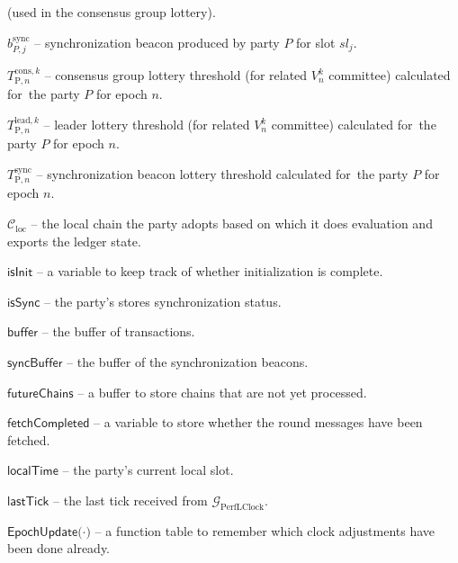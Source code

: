 \begin{legal}
    (used in the consensus group lottery).
    \item[\ding{113}] $b^{\text{sync}}_{P, j}$ -- synchronization beacon produced by party $P$ for slot $sl_j$.
    \item[\ding{113}] $T^{\text{cons}, k}_{\text{P}, n}$ -- consensus group lottery threshold (for related  $V^k_n$ committee) calculated for\
    the party $P$ for epoch $n$.
    \item[\ding{113}] $T^{\text{lead}, k}_{\text{P}, n}$ -- leader lottery threshold (for related $V^k_n$ committee) calculated for\
    the party $P$ for epoch $n$.
    \item[\ding{113}] $T^{\text{sync}}_{\text{P}, n}$ -- synchronization beacon lottery threshold calculated for\
    the party $P$ for epoch $n$.
    \item[\ding{113}] $\mathcal{C}_{\text{loc}}$ -- the local chain the party adopts based on which it does evaluation and
    exports the ledger state.
    \item[\ding{113}] $\textsf{isInit}$ -- a variable to keep track of whether initialization is complete.
    \item[\ding{113}] $\textsf{isSync}$ -- the party's stores synchronization status.
    \item[\ding{113}] $\textsf{buffer}$ -- the buffer of transactions.
    \item[\ding{113}] $\textsf{syncBuffer}$ -- the buffer of the synchronization beacons.
    \item[\ding{113}] $\textsf{futureChains}$ -- a buﬀer to store chains that are not yet processed.
    \item[\ding{113}] $\textsf{fetchCompleted}$ -- a variable to store whether the round messages have been fetched.
    \item[\ding{113}] $\textsf{localTime}$ -- the party's current local slot.
    \item[\ding{113}] $\textsf{lastTick}$ -- the last tick received from $\mathcal{G}_{\text{PerfLClock}}$.
    \item[\ding{113}] $\textsf{EpochUpdate(·)}$ -- a function table to remember which clock adjustments have been done already.

\end{legal}
